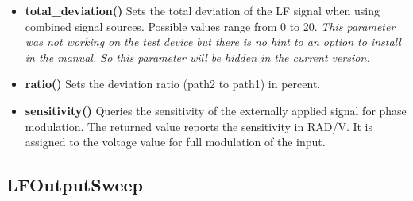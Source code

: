 \documentclass[11pt]{article} %
\begin{document}
\begin{itemize}
	{\it This parameter was not working on the test device but there is no hint to an option to install in the manual. So this parameter will be hidden in the current version.}
\item {\bf total\_deviation()} Sets the total deviation of the LF signal when using combined signal sources. Possible values range from 0 to 20.
	{\it This parameter was not working on the test device but there is no hint to an option to install in the manual. So this parameter will be hidden in the current version.}
\item {\bf ratio()} Sets the deviation ratio (path2 to path1) in percent.
\item {\bf sensitivity()} Queries the sensitivity of the externally applied signal for phase modulation. The returned value reports the sensitivity in RAD/V. It is assigned to the voltage value for full modulation of the input.
\end{itemize}


\subsection{LFOutputSweep}
\end{document}
